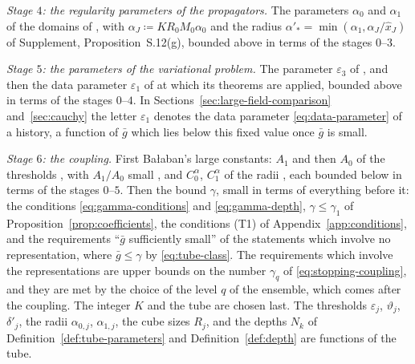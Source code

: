 \documentclass[11pt]{preprint}
\numberwithin{equation}{section}
\theoremstyle{definition}
\theoremstyle{remark}
\theoremstyle{plain}
\begin{document}
\emph{Stage $4$: the regularity parameters of the propagators.} The parameters $\alpha_0$ and $\alpha_1$ of the domains of \cite[(3.35)--(3.37), p.~396]{BalabanPBG}, with $\alpha_J \coloneqq KR_0M_0\alpha_0$ and the radius $\alpha'_* = \min(\alpha_1, \alpha_J/\hat x_J)$ of Supplement, Proposition~S.12(g), bounded above in terms of the stages $0$--$3$.

\emph{Stage $5$: the parameters of the variational problem.} The parameter $\varepsilon_3$ of \cite[Proposition~4, p.~292]{BalabanVAR}, and then the data parameter $\varepsilon_1$ of \cite[Theorem~1, p.~279]{BalabanVAR} at which its theorems are applied, bounded above in terms of the stages $0$--$4$. In Sections~\ref{sec:large-field-comparison} and~\ref{sec:cauchy} the letter $\varepsilon_1$ denotes the data parameter \eqref{eq:data-parameter} of a history, a function of $\bar g$ which lies below this fixed value once $\bar g$ is small.

\emph{Stage $6$: the coupling.} First Ba{\l}aban's large constants: $A_1$ and then $A_0$ of the thresholds \cite[p.~246, p.~265]{BalabanCRE}, with $A_1/A_0$ small \cite[p.~247]{BalabanCRE}, and $C_0^\alpha$, $C_1^\alpha$ of the radii \cite[(2.28), p.~259]{BalabanCRE}, each bounded below in terms of the stages $0$--$5$. Then the bound $\gamma$, small in terms of everything before it: the conditions \eqref{eq:gamma-conditions} and \eqref{eq:gamma-depth}, $\gamma \leq \gamma_1$ of Proposition~\ref{prop:coefficients}, the conditions (T1) of Appendix~\ref{app:conditions}, and the requirements ``$\bar g$ sufficiently small'' of the statements which involve no representation, where $\bar g \leq \gamma$ by \eqref{eq:tube-class}. The requirements which involve the representations are upper bounds on the number $\gamma_q$ of \eqref{eq:stopping-coupling}, and they are met by the choice of the level $q$ of the ensemble, which comes after the coupling. The integer $K$ and the tube are chosen last. The thresholds $\varepsilon_j$, $\vartheta_j$, $\delta'_j$, the radii $\alpha_{0,j}$, $\alpha_{1,j}$, the cube sizes $R_j$, and the depths $N_k$ of Definition~\ref{def:tube-parameters} and Definition~\ref{def:depth} are functions of the tube.
\end{document}

